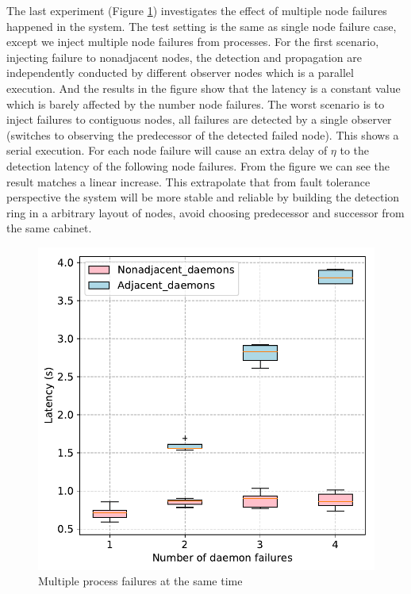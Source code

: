 \documentclass[sigconf]{acmart}
\begin{document}
The last experiment (Figure \ref{fig:multi_daemon_failure_nacl}) investigates the effect of multiple node failures happened in the system. The test setting is the same as single node failure case, except we inject multiple node failures from processes. For the first scenario, injecting failure to nonadjacent nodes, the detection and propagation are independently conducted by different observer nodes which is a parallel execution. And the results in the figure show that the latency is a constant value which is barely affected by the number node failures. The worst scenario is to inject failures to contiguous nodes, all failures are detected by a single observer (switches to observing the predecessor of the detected failed node). This shows a serial execution. For each node failure will cause an extra delay of $ \eta $ to the detection latency of the following node failures. From the figure we can see the result matches a linear increase. This extrapolate that from fault tolerance perspective the system will be more stable and reliable by building the detection ring in a arbitrary layout of nodes, avoid choosing predecessor and successor from the same cabinet.  

\begin{figure}[h]
  \centering
  \includegraphics[width=\linewidth]{multi_daemon_failures.pdf}
  \caption{Multiple process failures at the same time}
  \label{fig:multi_daemon_failure_nacl}
\end{figure}
\end{document}
